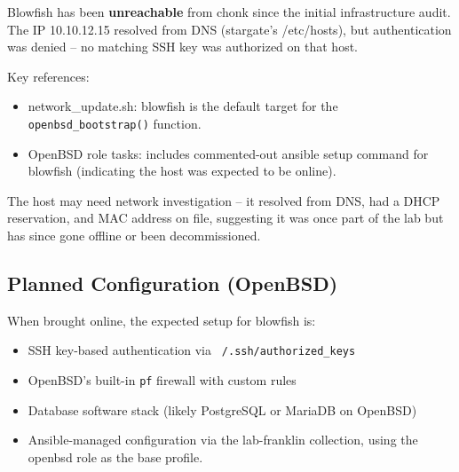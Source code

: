 Blowfish has been \textbf{unreachable} from chonk since the initial infrastructure audit. The IP 10.10.12.15 resolved from DNS (stargate's /etc/hosts), but authentication was denied -- no matching SSH key was authorized on that host.

Key references:
\begin{itemize}
    \item network\_update.sh: blowfish is the default target for the \texttt{openbsd\_bootstrap()} function.
    
    \item OpenBSD role tasks: includes commented-out ansible setup command for blowfish (indicating the host was expected to be online).
\end{itemize}

The host may need network investigation -- it resolved from DNS, had a DHCP reservation, and MAC address on file, suggesting it was once part of the lab but has since gone offline or been decommissioned.

\subsection{Planned Configuration (OpenBSD)}

When brought online, the expected setup for blowfish is:

\begin{itemize}
    \item SSH key-based authentication via \texttt{~/.ssh/authorized\_keys}
    
    \item OpenBSD's built-in \texttt{pf} firewall with custom rules
    
    \item Database software stack (likely PostgreSQL or MariaDB on OpenBSD)
    
    \item Ansible-managed configuration via the lab-franklin collection, using the openbsd role as the base profile.
\end{itemize}
